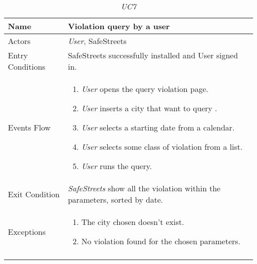 \documentclass[../../../RASD.tex]{subfiles}
\begin{document}
    \begin{center}
        \begin{longtable}{| p{.35\linewidth} | p{.65\linewidth} |}
            \hline
            \textbf{Name} & \textbf{Violation query by a user}\\ \hline
            Actors & \textit{User}, SafeStreets\\ \hline
            Entry Conditions & SafeStreets successfully installed and User signed in.\\ \hline
            Events Flow &
            \begin{enumerate}
                \item \textit{User} opens the query violation page.
                \item \textit{User} inserts a city that want to query .
                \item \textit{User} selects a starting date from a calendar.
                \item \textit{User} selects some class of violation from a list.
                \item \textit{User} runs the query.
            \end{enumerate}
            \\ \hline
            Exit Condition & \textit{SafeStreets} show all the violation within the parameters, sorted by date.\\ \hline
            Exceptions &
            \begin{enumerate}
                \item The city chosen doesn’t exist.
                \item No violation found for the chosen parameters.
            \end{enumerate}
            \\
            \hline
            \caption[\textit{Use Case 7}]{\textit{UC7}}
        \end{longtable}
    \end{center}
    \newpage
\end{document}
